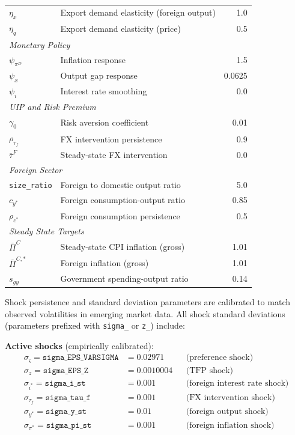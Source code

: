 \documentclass[12pt]{article}
\begin{document}
\begin{table}[htbp]
\begin{singlespace}
\begin{tabular}{llr}
$\eta_x$ & Export demand elasticity (foreign output) & 1.0 \\
$\eta_q$ & Export demand elasticity (price) & 0.5 \\
\midrule
\multicolumn{3}{l}{\textit{Monetary Policy}} \\
$\psi_{\pi^D}$ & Inflation response & 1.5 \\
$\psi_x$ & Output gap response & 0.0625 \\
$\psi_i$ & Interest rate smoothing & 0.0 \\
\midrule
\multicolumn{3}{l}{\textit{UIP and Risk Premium}} \\
$\gamma_0$ & Risk aversion coefficient & 0.01 \\
$\rho_{\tau_f}$ & FX intervention persistence & 0.9 \\
$\overline{\tau}^F$ & Steady-state FX intervention & 0.0 \\
\midrule
\multicolumn{3}{l}{\textit{Foreign Sector}} \\
\texttt{size\_ratio} & Foreign to domestic output ratio & 5.0 \\
$c_{y^*}$ & Foreign consumption-output ratio & 0.85 \\
$\rho_{c^*}$ & Foreign consumption persistence & 0.5 \\
\midrule
\multicolumn{3}{l}{\textit{Steady State Targets}} \\
$\overline{\Pi}^C$ & Steady-state CPI inflation (gross) & 1.01 \\
$\overline{\Pi}^{C,*}$ & Foreign inflation (gross) & 1.01 \\
$s_{gy}$ & Government spending-output ratio & 0.14 \\
\bottomrule
\end{tabular}
\endgroup
\end{singlespace}
\end{table}

Shock persistence and standard deviation parameters are calibrated to match observed volatilities in emerging market data. All shock standard deviations (parameters prefixed with \texttt{sigma\_} or \texttt{z\_}) include:

\textbf{Active shocks} (empirically calibrated):
\begin{align*}
\sigma_\varsigma = \texttt{sigma\_EPS\_VARSIGMA} &= 0.02971 & &\text{(preference shock)} \\
\sigma_z = \texttt{sigma\_EPS\_Z} &= 0.0010004 & &\text{(TFP shock)} \\
\sigma_{i^*} = \texttt{sigma\_i\_st} &= 0.001 & &\text{(foreign interest rate shock)} \\
\sigma_{\tau_f} = \texttt{sigma\_tau\_f} &= 0.001 & &\text{(FX intervention shock)} \\
\sigma_{y^*} = \texttt{sigma\_y\_st} &= 0.01 & &\text{(foreign output shock)} \\
\sigma_{\pi^*} = \texttt{sigma\_pi\_st} &= 0.001 & &\text{(foreign inflation shock)}
\end{align*}
\end{document}
